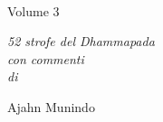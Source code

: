 \cleartorecto
\thispagestyle{empty}

\vspace*{1em}

{\centering

\\[0.4\baselineskip]
Volume 3
\vspace*{3\baselineskip}

{\itshape 52 strofe del Dhammapada\\
con commenti\\
di}

\vspace*{2\baselineskip}
Ajahn Munindo

\vfill



}
